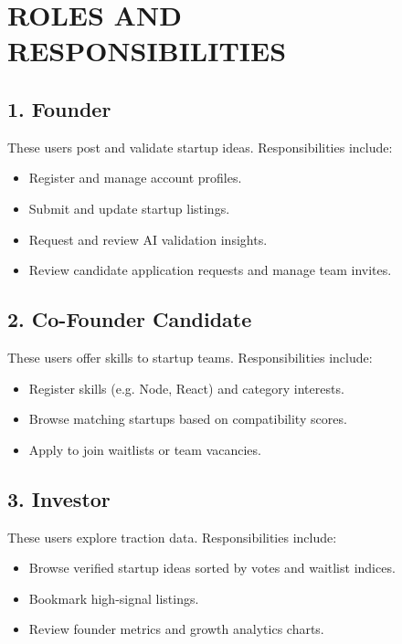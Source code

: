 \documentclass[12pt,a4paper]{report}
\begin{document}
\chapter{ROLES AND RESPONSIBILITIES}

\section{1. Founder}
These users post and validate startup ideas. Responsibilities include:
\begin{itemize}
    \item Register and manage account profiles.
    \item Submit and update startup listings.
    \item Request and review AI validation insights.
    \item Review candidate application requests and manage team invites.
\end{itemize}

\section{2. Co-Founder Candidate}
These users offer skills to startup teams. Responsibilities include:
\begin{itemize}
    \item Register skills (e.g. Node, React) and category interests.
    \item Browse matching startups based on compatibility scores.
    \item Apply to join waitlists or team vacancies.
\end{itemize}

\section{3. Investor}
These users explore traction data. Responsibilities include:
\begin{itemize}
    \item Browse verified startup ideas sorted by votes and waitlist indices.
    \item Bookmark high-signal listings.
    \item Review founder metrics and growth analytics charts.
\end{itemize}
\end{document}
